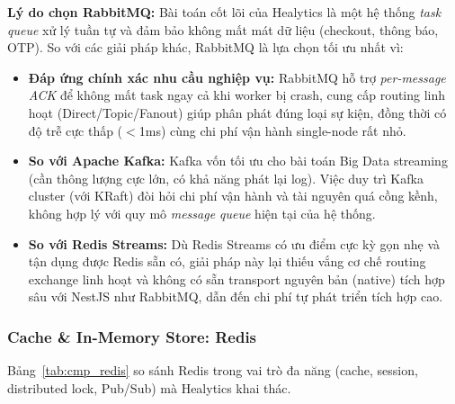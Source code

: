 \textbf{Lý do chọn RabbitMQ:}
Bài toán cốt lõi của Healytics là một hệ thống \textit{task queue} xử lý tuần tự và đảm bảo không mất mát dữ liệu (checkout, thông báo, OTP). So với các giải pháp khác, RabbitMQ là lựa chọn tối ưu nhất vì:
\begin{itemize}
    \item \textbf{Đáp ứng chính xác nhu cầu nghiệp vụ:} RabbitMQ hỗ trợ \textit{per-message ACK} để không mất task ngay cả khi worker bị crash, cung cấp routing linh hoạt (Direct/Topic/Fanout) giúp phân phát đúng loại sự kiện, đồng thời có độ trễ cực thấp ($<$1ms) cùng chi phí vận hành single-node rất nhỏ.
    \item \textbf{So với Apache Kafka:} Kafka vốn tối ưu cho bài toán Big Data streaming (cần thông lượng cực lớn, có khả năng phát lại log). Việc duy trì Kafka cluster (với KRaft) đòi hỏi chi phí vận hành và tài nguyên quá cồng kềnh, không hợp lý với quy mô \textit{message queue} hiện tại của hệ thống.
    \item \textbf{So với Redis Streams:} Dù Redis Streams có ưu điểm cực kỳ gọn nhẹ và tận dụng được Redis sẵn có, giải pháp này lại thiếu vắng cơ chế routing exchange linh hoạt và không có sẵn transport nguyên bản (native) tích hợp sâu với NestJS như RabbitMQ, dẫn đến chi phí tự phát triển tích hợp cao.
\end{itemize}

\subsubsection{Cache \& In-Memory Store: Redis}

Bảng~\ref{tab:cmp_redis} so sánh Redis trong vai trò đa năng (cache, session, distributed lock, Pub/Sub) mà Healytics khai thác.


